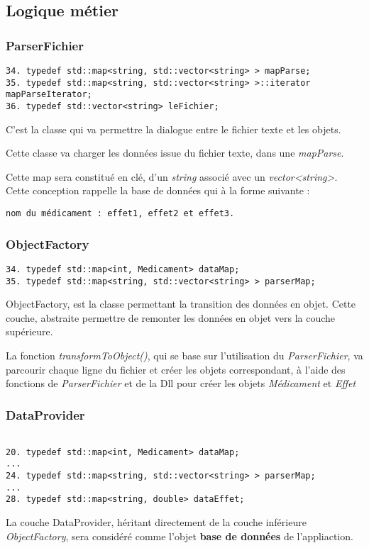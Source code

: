 \documentclass[12pt,a4paper]{report}
\begin{document}
\subsection*{Logique métier}
\subsubsection*{ParserFichier}
\begin{verbatim}
34.	typedef std::map<string, std::vector<string> > mapParse;
35.	typedef std::map<string, std::vector<string> >::iterator mapParseIterator;
36. typedef std::vector<string> leFichier;
\end{verbatim}

C'est la classe qui va permettre la dialogue entre le fichier texte et les objets. 

Cette classe va charger les données issue du fichier texte, dans une \textit{mapParse}.

Cette map sera constitué en clé, d'un \textit{string} associé avec un \textit{vector<string>}. 
Cette conception rappelle la base de données qui à la forme suivante : 
\begin{verbatim}
nom du médicament : effet1, effet2 et effet3.
\end{verbatim}

\subsubsection*{ObjectFactory}
\begin{verbatim}
34. typedef std::map<int, Medicament> dataMap;
35. typedef std::map<string, std::vector<string> > parserMap;
\end{verbatim}

ObjectFactory, est la classe permettant la transition des données en objet. 
Cette couche, abstraite permettre de remonter les données en objet vers la couche supérieure.  

La fonction \textit{transformToObject()}, qui se base sur l'utilisation du \textit{ParserFichier}, va parcourir chaque ligne du fichier et créer les objets correspondant, à l'aide des fonctions de \textit{ParserFichier} et de la Dll pour créer les objets \textit{Médicament} et \textit{Effet}

\subsubsection*{DataProvider}
\begin{verbatim}

20. typedef std::map<int, Medicament> dataMap;
...
24. typedef std::map<string, std::vector<string> > parserMap;
...
28. typedef std::map<string, double> dataEffet;
\end{verbatim}
La couche DataProvider, héritant directement de la couche inférieure \textit{ObjectFactory}, sera considéré comme l'objet \textbf{base de données} de l'appliaction. 
\end{document}
